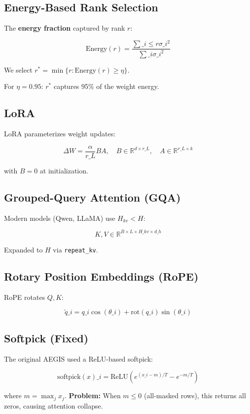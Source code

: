 \subsection{Energy-Based Rank Selection}

The \textbf{energy fraction} captured by rank $r$:

\[
\text{Energy}(r) = \frac{\sum\_{i \leq r} \sigma\_i^2}{\sum\_i \sigma\_i^2}
\]

We select $r^* = \min \{ r : \text{Energy}(r) \geq \eta \}$.

For $\eta = 0.95$: $r^*$ captures 95\% of the weight energy.

\subsection{LoRA}

LoRA parameterizes weight updates:

\[
\Delta W = \frac{\alpha}{r\_L} B A, \quad B \in \mathbb{R}^{d \times r\_L}, \quad A \in \mathbb{R}^{r\_L \times k}
\]

with $B = 0$ at initialization.

\subsection{Grouped-Query Attention (GQA)}

Modern models (Qwen, LLaMA) use $H_{kv} < H$:

\[
K, V \in \mathbb{R}^{B \times L \times H\_{kv} \times d\_h}
\]

Expanded to $H$ via \texttt{repeat\_kv}.

\subsection{Rotary Position Embeddings (RoPE)}

RoPE rotates $Q, K$:

\[
\tilde{q}\_i = q\_i \cos(\theta\_i) + \text{rot}(q\_i) \sin(\theta\_i)
\]

\subsection{Softpick (Fixed)}

The original AEGIS used a ReLU-based softpick:

\[
\text{softpick}(x)\_i = \text{ReLU}\!\left(e^{(x\_i - m)/T} - e^{-m/T}\right)
\]

where $m = \max_j x_j$. \textbf{Problem:} When $m \leq 0$ (all-masked rows), 
this returns all zeros, causing attention collapse.

